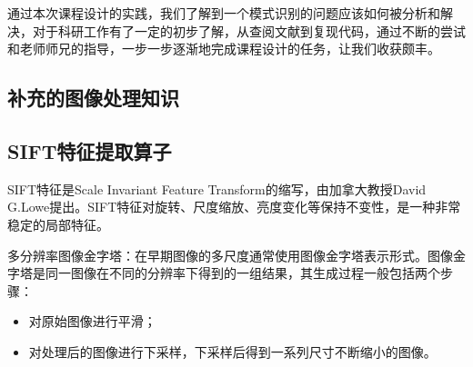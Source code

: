 \documentclass[supercite]{HustGraduPaper}
\begin{document}
\begin{sloppypar}
  通过本次课程设计的实践，我们了解到一个模式识别的问题应该如何被分析和解决，对于科研工作有了一定的初步了解，从查阅文献到复现代码，通过不断的尝试和老师师兄的指导，一步一步逐渐地完成课程设计的任务，让我们收获颇丰。
	
	
  \begin{appendices}
    \section{补充的图像处理知识}
    \subsection{SIFT特征提取算子}
    SIFT特征是Scale Invariant Feature Transform的缩写，由加拿大教授David G.Lowe提出。SIFT特征对旋转、尺度缩放、亮度变化等保持不变性，是一种非常稳定的局部特征。

    {\heiti  多分辨率图像金字塔：}在早期图像的多尺度通常使用图像金字塔表示形式。图像金字塔是同一图像在不同的分辨率下得到的一组结果，其生成过程一般包括两个步骤：\begin{itemize}
     \item  对原始图像进行平滑；
     \item 对处理后的图像进行下采样，下采样后得到一系列尺寸不断缩小的图像。
    \end{itemize}


\end{appendices}
\end{sloppypar}
\end{document}
